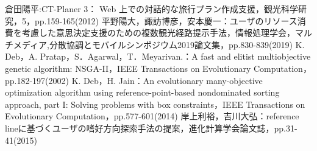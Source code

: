 





\begin{thebibliography}{99}
 倉田陽平:CT-Planer 3： Web 上での対話的な旅行プラン作成支援，観光科学研究，5，pp.159-165(2012)
 平野陽大，諏訪博彦，安本慶一：ユーザのリソース消費を考慮した意思決定支援のための複数観光経路提示手法，情報処理学会，マルチメディア,分散協調とモバイルシンポジウム2019論文集，pp.830-839(2019)
 K. Deb，A. Pratap，S．Agarwal，T．Meyarivan.：A fast and elitist multiobjective genetic algorithm: NSGA-I\hspace{-.1em}I，IEEE Transactions on Evolutionary Computation，pp.182-197(2002)
 K. Deb，H. Jain：An evolutionary many-objective optimization algorithm using reference-point-based nondominated sorting approach, part I: Solving problems with box constraints，IEEE Transactions on Evolutionary Computation，pp.577-601(2014)
 岸上利裕，吉川大弘：reference lineに基づくユーザの嗜好方向探索手法の提案，進化計算学会論文誌，pp.31-41(2015)
\end{thebibliography}

%
%
